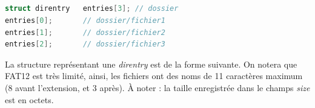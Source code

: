 \documentclass[11pt,a4paper]{article}
\begin{document}
\medskip

\begin{table}[ht!]
  \centering
  \begin{minipage}{0.3\textwidth}

\noindent {} \\
 \\
 \\
 \\

  \end{minipage}
  \hfillx
  \begin{minipage}{0.6\textwidth}

\begin{lstlisting}[language=C,commentstyle=\color{commentgreen}]
struct direntry   entries[3]; // dossier
entries[0];       // dossier/fichier1
entries[1];       // dossier/fichier2
entries[2];       // dossier/fichier3 \end{lstlisting}

  \end{minipage}
\end{table}

\newpage

La structure représentant une \textit{direntry} est de la forme suivante.
On notera que FAT12 est très limité, ainsi, les fichiers ont des noms de 11 caractères maximum (8 avant l'extension, et 3 après).
\`A noter : la taille enregistrée dans le champs \textit{size} est en octets.
\end{document}
